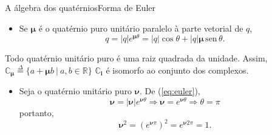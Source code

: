 \documentclass[10pt,compress]{beamer}
\newcommand{\qi}{\boldsymbol{i}}
\newcommand{\qmu}{\boldsymbol{\mu}}
\newcommand{\sen}{\mathrm{\, sen \,}}
\begin{document}
\begin{frame}{A \'algebra dos quat\'ernios}{Forma de Euler}
\begin{itemize}
\item Se $ \qmu $ \'e o quat\'ernio puro unit\'ario paralelo \`a parte vetorial de $ q $,
\begin{equation}
\label{eq:euler}
q = |q| e^{\qmu \theta} = |q|\cos \theta + |q|\qmu \sen \theta.
\end{equation}
\end{itemize}

\begin{block}{}
Todo quat\'ernio unit\'ario puro \'e uma raiz quadrada da unidade. Assim, $ \mathbb{C}_{\qmu} \overset{\Delta}{=} \{ a + \qmu b \ |\  a, b \in \mathbb{R} \}$ $ \mathbb{C}_{\qi} $ \'e isomorfo ao conjunto dos complexos.
\end{block}

\begin{itemize}
\item Seja o quat\'ernio unit\'ario puro $ \mathbf{\nu} $. De (\ref{eq:euler}),
\begin{equation}
\mathbf{\nu} = |\mathbf{\nu}| e^{\mathbf{\nu} \theta}
\Rightarrow
\mathbf{\nu} = e^{\mathbf{\nu} \theta} \Rightarrow \theta = \pi
\end{equation}
portanto,
\begin{equation}
\mathbf{\nu}^2 = \left( e^{\mathbf{\nu}\pi} \right)^2 = e^{\mathbf{\nu} 2\pi} = 1.
\end{equation}
\end{itemize}
\end{frame}
\end{document}
